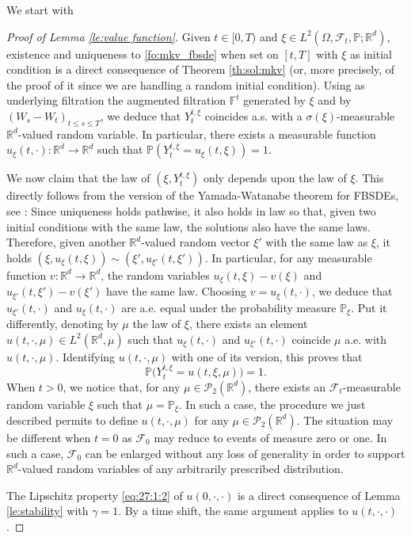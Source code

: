\documentclass[11pt]{amsart}
\begin{document}
We start with
\begin{proof}[Proof of Lemma \ref{le:value function}]
Given $t \in [0,T)$ and $\xi \in L^2(\Omega,{\mathcal F}_{t},{\mathbb P};{\mathbb R}^d)$, existence and uniqueness to \eqref{fo:mkv_fbsde} when set on $[t,T]$ with $\xi$ as initial condition is a direct consequence of Theorem \ref{th:sol:mkv} (or, more precisely, of the proof of it since we are handling a random initial condition). Using as underlying filtration the augmented filtration 
${\mathbb F}^t$ generated by $\xi$ and by $(W_{s}-W_{t})_{t \leq s \leq T}$, we deduce that $Y_{t}^{t,\xi}$ coincides a.s. with a $\sigma(\xi)$-measurable ${\mathbb R}^d$-valued random variable. In particular, there exists a measurable function $u_{\xi}(t,\cdot) : {\mathbb R}^d \rightarrow {\mathbb R}^d$ such that ${\mathbb P} (Y_{t}^{t,\xi} = u_{\xi}(t,\xi))=1$. 

We now claim that the law of 
$(\xi,Y_{t}^{t,\xi})$ only depends upon the law of $\xi$. This directly follows from the version of the Yamada-Watanabe theorem for FBSDEs, see \cite{Delarue02}: Since uniqueness holds pathwise, it also holds in law so that, given two initial conditions with the same law, the solutions also have the same laws.  
Therefore, given another ${\mathbb R}^d$-valued random vector $\xi'$ with the same law as $\xi$, it holds $(\xi,u_{\xi}(t,\xi)) \sim (\xi',u_{\xi'}(t,\xi'))$. In particular, for any measurable function $v : {\mathbb R}^d \rightarrow {\mathbb R}^d$, the random variables $u_{\xi}(t,\xi) - v(\xi)$ and $u_{\xi'}(t,\xi') - v(\xi')$ have the same law. Choosing $v=u_{\xi}(t,\cdot)$, we deduce that $u_{\xi'}(t,\cdot)$ and $u_{\xi}(t,\cdot)$ are a.e. equal under the probability measure ${\mathbb P}_{\xi}$. Put it differently, denoting by $\mu$ the law of $\xi$, there exists an element $u(t,\cdot,\mu) \in L^2({\mathbb R}^d,\mu)$ such that $u_{\xi}(t,\cdot)$ and $u_{\xi'}(t,\cdot)$ coincide $\mu$ a.e. with $u(t,\cdot,\mu)$. Identifying $u(t,\cdot,\mu)$ with one of its version, this proves that 
\begin{equation*}
{\mathbb P} \bigl( Y_{t}^{t,\xi} = u(t,\xi,\mu) \bigr) = 1. 
\end{equation*}
When $t>0$, we notice that, for any $\mu \in {\mathcal P}_{2}({\mathbb R}^d)$, there exists an ${\mathcal F}_{t}$-measurable random variable $\xi$ such that $\mu = {\mathbb P}_{\xi}$. In such a case, the procedure we just described permits to define
$u(t,\cdot,\mu)$ for any $\mu \in {\mathcal P}_{2}({\mathbb R}^d)$. The situation may be different when $t=0$ as ${\mathcal F}_{0}$ may reduce to events of measure zero or one. In such a case, ${\mathcal F}_{0}$ can be enlarged without any loss of generality in order to support ${\mathbb R}^d$-valued random variables of any arbitrarily prescribed distribution. 

The Lipschitz property 
\eqref{eq:27:1:2}
of $u(0,\cdot,\cdot)$ is a direct consequence of 
Lemma \ref{le:stability} with $\gamma=1$. By a time shift, the same argument applies to $u(t,\cdot,\cdot)$. 
\end{proof}
\end{document}
